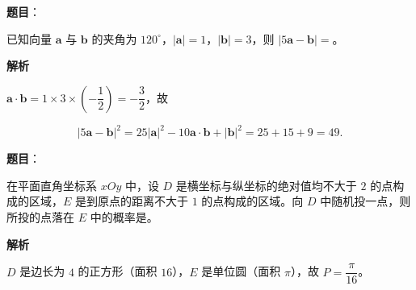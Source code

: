 \begin{answer}

\textbf{题目}：

已知向量 $\boldsymbol a$ 与 $\boldsymbol b$ 的夹角为 $120^\circ$，$|\boldsymbol a|=1$，$|\boldsymbol b|=3$，则 $|5\boldsymbol a-\boldsymbol b|=$\gkblank{}。

\textbf{解析}

$\boldsymbol a\cdot\boldsymbol b=1\times3\times\left(-\dfrac12\right)=-\dfrac32$，故

\nopagebreak[4]
\[|5\boldsymbol a-\boldsymbol b|^2=25|\boldsymbol a|^2-10\boldsymbol a\cdot\boldsymbol b+|\boldsymbol b|^2=25+15+9=49.\]


\end{answer}
\begin{answer}

\textbf{题目}：

在平面直角坐标系 $xOy$ 中，设 $D$ 是横坐标与纵坐标的绝对值均不大于 $2$ 的点构成的区域，$E$ 是到原点的距离不大于 $1$ 的点构成的区域。向 $D$ 中随机投一点，则所投的点落在 $E$ 中的概率是\gkblank{}。

\textbf{解析}

$D$ 是边长为 $4$ 的正方形（面积 $16$），$E$ 是单位圆（面积 $\pi$），故 $P=\dfrac{\pi}{16}$。


\end{answer}
